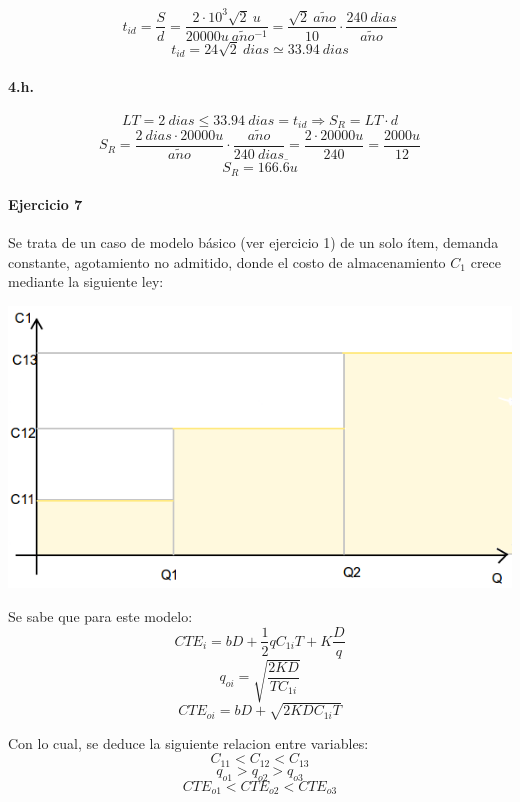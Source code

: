 \documentclass{article}
\def \anio {a\tilde{n}o}
\begin{document}
        $$ t_{id} = \frac{S}{d} = \frac{2 \cdot 10^3 \sqrt {2}\ u}{20000u\ \anio^{-1}} = \frac{\sqrt{2}\ \anio}{10} \cdot \frac{240\ dias}{\anio} $$
        $$ \boxed{ t_{id} = 24\sqrt{2}\ dias \simeq 33.94\ dias } $$
    
    \paragraph{4.h.}
        $$ LT = 2\ dias \leq 33.94\ dias = t_{id} \Rightarrow S_R = LT \cdot d $$
        $$ S_R = \frac{2\ dias \cdot 20000u}{\anio} \cdot \frac{\anio}{240\ dias} = \frac{2 \cdot 20000u}{240} = \frac{2000u}{12} $$
        $$ \boxed{S_R = 166.\overline{6} u} $$

\pagebreak

\paragraph{Ejercicio 7}
Se trata de un caso de modelo básico (ver ejercicio 1) de un solo ítem, demanda constante, agotamiento no admitido, donde el costo de almacenamiento $C_{1}$ crece mediante la siguiente ley:
\begin{center}
  \includegraphics[scale=0.4,keepaspectratio=true]{img/7/7_QvsC1.png} 
\end{center}
Se sabe que para este modelo:
  \begin{equation}\label{7_CTE}CTE_i = bD + \frac{1}{2}qC_{1i}T + K\frac{D}{q} \end{equation}
  $$ q_{oi} = \sqrt{ \frac{2KD}{TC_{1i}}} $$
  $$ CTE_{oi} = bD + \sqrt{ 2KDC_{1i}T }$$

Con lo cual, se deduce la siguiente relacion entre variables:
 $$ C_{11} < C_{12} < C_{13} $$
 $$ q_{o1} > q_{o2} > q_{o3}$$
 $$ CTE_{o1} < CTE_{o2} < CTE_{o3} $$
 
\end{document}
